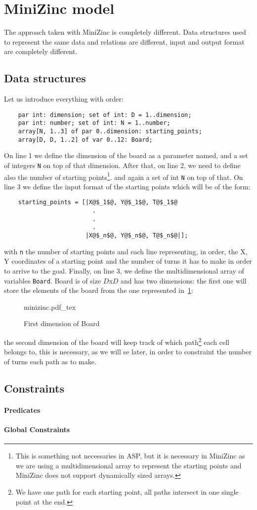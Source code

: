 \section{MiniZinc model}
The approach taken with MiniZinc is completely different. Data structures used to represent the same data and relations are different, input and output format are completely different.
\subsection{Data structures}
Let us introduce everything with order:
\begin{verbatim}
    par int: dimension; set of int: D = 1..dimension; 
    par int: number; set of int: N = 1..number; 
    array[N, 1..3] of par 0..dimension: starting_points; 
    array[D, D, 1..2] of var 0..12: Board;
\end{verbatim}

On line 1 we define the dimension of the board as a parameter named, and a set of integers \texttt{N} on top of that dimension.
After that, on line 2, we need to define also the number of starting points\footnote{This is something not necessaries in ASP, but it is necessary in MiniZinc as we are using a multidimensional array to represent the starting points and MiniZinc does not support dynamically sized arrays.}. and again a set of int \texttt{N} on top of that.
On line 3 we define the input format of the starting points which will be of the form:
\begin{verbatim}
    starting_points = [|X@$_1$@, Y@$_1$@, T@$_1$@
                         .
                         .
                         .
                       |X@$_n$@, Y@$_n$@, T@$_n$@|];
\end{verbatim}
with  \texttt{n} the number of starting points and each line representing, in order, the X, Y coordinates of a starting point and the number of turns it has to make in order to arrive to the goal.
Finally, on line 3, we define the multidimensional array of variables \texttt{Board}. Board is of size $D$x$D$ and has two dimensions: the first one will store the elements of the board from the one represented in~\ref{figm:board}:
\begin{figure}[ht]
    \centering
    \def\svgwidth{\columnwidth}
    {minizinc.pdf_tex}
    \caption{First dimension of Board}
    \label{figm:board}
\end{figure}
the second dimension of the board will keep track of which path\footnote{We have one path for each starting point, all paths intersect in one single point at the end.} each cell belongs to, this is necessary, as we will se later, in order to constraint the number of turns each path as to make.

\subsection{Constraints}


\paragraph{Predicates}

\paragraph{Global Constraints}